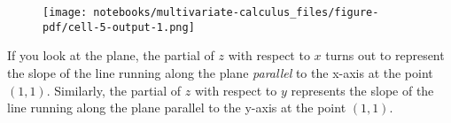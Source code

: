 \documentclass[
  letterpaper,
  DIV=11,
  numbers=noendperiod]{scrreprt}
\newenvironment{Shaded}{\begin{snugshade}}{\end{snugshade}}
\newcommand{\DecValTok}[1]{\textcolor[rgb]{0.68,0.00,0.00}{#1}}
\newcommand{\KeywordTok}[1]{\textcolor[rgb]{0.00,0.23,0.31}{#1}}
\newcommand{\NormalTok}[1]{\textcolor[rgb]{0.00,0.23,0.31}{#1}}
\newcommand{\OperatorTok}[1]{\textcolor[rgb]{0.37,0.37,0.37}{#1}}
\newcommand{\SpecialCharTok}[1]{\textcolor[rgb]{0.37,0.37,0.37}{#1}}
\newcommand{\SpecialStringTok}[1]{\textcolor[rgb]{0.13,0.47,0.30}{#1}}
\newcommand{\VariableTok}[1]{\textcolor[rgb]{0.07,0.07,0.07}{#1}}
\begin{document}
\begin{Shaded}
\end{Shaded}

\begin{figure}[H]

{\centering \texttt{[image: notebooks/multivariate-calculus\_files/figure-pdf/cell-5-output-1.png]}

}

\end{figure}

If you look at the plane, the partial of \(z\) with respect to \(x\)
turns out to represent the slope of the line running along the plane
\emph{parallel} to the x-axis at the point \((1,1)\). Similarly, the
partial of \(z\) with respect to \(y\) represents the slope of the line
running along the plane parallel to the y-axis at the point \((1,1)\).
\end{document}
